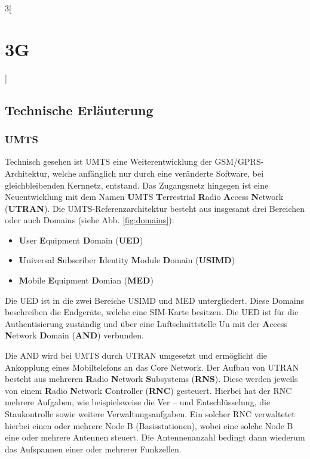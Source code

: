 \begin{multicols}{3}[\section{3G}]
\subsection*{Technische Erläuterung}
\subsubsection*{UMTS}
Technisch gesehen ist UMTS eine Weiterentwicklung der GSM/GPRS-Architektur, welche anfänglich nur durch eine veränderte Software, bei gleichbleibenden Kernnetz, entstand. Das Zugangsnetz hingegen ist eine Neuentwicklung mit dem Namen \textbf{U}MTS \textbf{T}errestrial \textbf{R}adio \textbf{A}ccess \textbf{N}etwork (\textbf{UTRAN}). Die UMTS-Referenzarchitektur besteht aus insgesamt drei Bereichen oder auch Domains (siehe Abb. \ref{fig:domains}):
\begin{itemize}
	\item \textbf{U}ser \textbf{E}quipment \textbf{D}omain (\textbf{UED})
	\item \textbf{U}niversal \textbf{S}ubscriber \textbf{I}dentity \textbf{M}odule \textbf{D}omain (\textbf{USIMD}) 
	\item \textbf{M}obile \textbf{E}quipment \textbf{D}omian (\textbf{MED})
\end{itemize}
Die UED ist in die zwei Bereiche USIMD und MED untergliedert. Diese Domains beschreiben die Endgeräte, welche eine SIM-Karte besitzen. Die UED ist für die Authentisierung zuständig und über eine Luftschnittstelle Uu mit der \textbf{A}ccess \textbf{N}etwork \textbf{D}omain (\textbf{AND}) verbunden. 
 
Die AND wird bei UMTS durch UTRAN umgesetzt und ermöglicht die Ankopplung eines Mobiltelefons an das Core Network. Der Aufbau von UTRAN besteht aus mehreren \textbf{R}adio \textbf{N}etwork \textbf{S}ubsystems (\textbf{RNS}). Diese werden jeweils von einem \textbf{R}adio \textbf{N}etwork \textbf{C}ontroller (\textbf{RNC}) gesteuert. Hierbei hat der RNC mehrere Aufgaben, wie beispielsweise die Ver – und Entschlüsselung, die Staukontrolle sowie weitere Verwaltungsaufgaben. Ein solcher RNC verwaltetet hierbei einen oder mehrere Node B (Basisstationen), wobei eine solche Node B eine oder mehrere Antennen steuert. Die Antennenanzahl bedingt dann wiederum das Aufspannen einer oder mehrerer Funkzellen.


\end{multicols}
